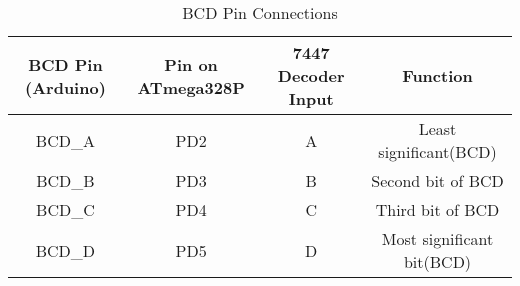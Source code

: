 \begin{table}[h]
    \centering
    \begin{tabular}{|c|c|c|c|}
        \hline
        \textbf{BCD Pin (Arduino)} & \textbf{Pin on ATmega328P} & \textbf{7447 Decoder Input} & \textbf{Function} \\
        \hline
        BCD\_A  & PD2  & A  & Least significant(BCD) \\
        BCD\_B  & PD3  & B  & Second bit of BCD \\
        BCD\_C  & PD4  & C  & Third bit of BCD \\
        BCD\_D  & PD5  & D  & Most significant bit(BCD)\\
        \hline
    \end{tabular}
    \caption{BCD Pin Connections}
    \label{tab:bcd_pins}
\end{table}
